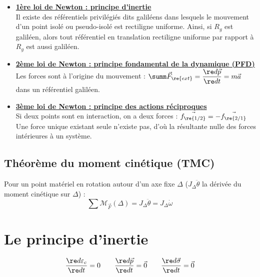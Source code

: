 \documentclass[13pt, twoside, a4paper, french]{report}
\begin{document}
            \begin{itemize}
                \item \underline{\textbf{1ère loi de Newton : principe d’inertie}}\\
                Il existe des référentiels privilégiés dits galiléens dans lesquels le mouvement d'un point isolé ou pseudo-isolé est rectiligne uniforme.
                Ainsi, si $R_g$ est galiléen, alors tout référentiel en translation rectiligne uniforme par rapport à $R_g$ est aussi galiléen.\\

                \item \underline{\textbf{2ème loi de Newton : principe fondamental de la dynamique (PFD)}}\\
                Les forces sont à l’origine du mouvement : $\summ \vec F_\re{ext} = \dfrac{\re d \vec p}{\re d t} = m \vec a$ dans un référentiel galiléen.\\

                \item \underline{\textbf{3ème loi de Newton : principe des actions réciproques}}\\
                Si deux points sont en interaction, on a deux forces : $\vec{f_\re{1/2}} = - \vec{f_\re{2/1}}$\\
                Une force unique existant seule n'existe pas, d'où la résultante nulle des forces intérieures à un système.
            \end{itemize}

        \subsection{Théorème du moment cinétique (TMC)}\label{subsec:theoreme-du-moment-cinetique}

            Pour un point matériel en rotation autour d'un axe fixe $\Delta$ ($J_\Delta \ddot \theta$ la dérivée du moment cinétique sur $\Delta$) :
            \[\sum \mathcal{M}_{\vec F} (\Delta) = J_\Delta \ddot \theta = J_\Delta \dot \omega \]

    \section{Le principe d'inertie}\label{sec:le-principe-d'inertie}

        \[\dfrac{\re d \varepsilon_c}{\re d t} = 0 \quad\quad \dfrac{\re d \vec p}{\re d t} = \vec 0 \quad\quad \dfrac{\re d \vec \sigma}{\re d t} = \vec 0\]
\end{document}
